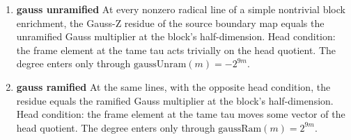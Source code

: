 \begin{enumerate}
\item[(1)] \textbf{gauss unramified} At every nonzero radical line of a simple nontrivial block enrichment, the Gauss-Z residue of the source boundary map equals the unramified Gauss multiplier at the block's half-dimension. Head condition: the frame element at the tame tau acts trivially on the head quotient. The degree enters only through $\mathrm{gaussUnram}(m)=-2^{9m}$.
\item[(2)] \textbf{gauss ramified} At the same lines, with the opposite head condition, the residue equals the ramified Gauss multiplier at the block's half-dimension. Head condition: the frame element at the tame tau moves some vector of the head quotient. The degree enters only through $\mathrm{gaussRam}(m)=2^{9m}$.
\end{enumerate}
